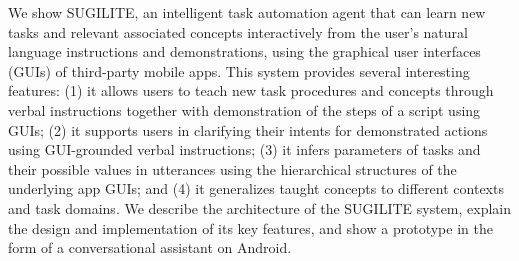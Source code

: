 We show SUGILITE, an intelligent task automation agent that can learn new tasks and relevant associated concepts interactively from the user's natural language instructions and demonstrations, using the graphical user interfaces (GUIs) of third-party mobile apps. This system provides several interesting features: (1) it allows users to teach new task procedures and concepts through verbal instructions together with demonstration of the steps of a script using GUIs; (2) it supports users in clarifying their intents for demonstrated actions using GUI-grounded verbal instructions; (3) it infers parameters of tasks and their possible values in utterances using the hierarchical structures of the underlying app GUIs; and (4) it generalizes taught concepts to different contexts and task domains.  We describe the architecture of the SUGILITE system, explain the design and implementation of its key features, and show a prototype in the form of a conversational assistant on Android.
